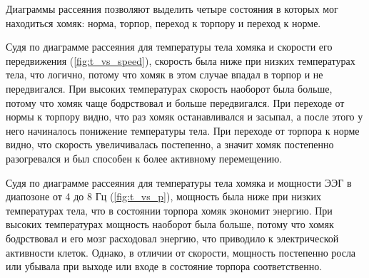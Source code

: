 \documentclass[12pt,a4paper,oneside]{article}
\begin{document}
Диаграммы рассеяния позволяют выделить четыре состояния в которых мог находиться хомяк: норма, торпор, переход к торпору и переход к норме. 

Судя по диаграмме рассеяния для температуры тела хомяка и скорости его передвижения (\ref{fig:t_vs_speed}), скорость была ниже при низких температурах тела, что логично, потому что хомяк в этом случае впадал в торпор и не передвигался. При высоких температурах скорость наоборот была больше, потому что хомяк чаще бодрствовал и больше передвигался. При переходе от нормы к торпору видно, что раз хомяк останавливался и засыпал, а после этого у него начиналось понижение температуры тела. При переходе от торпора к норме видно, что скорость увеличивалась постепенно, а значит хомяк постепенно разогревался и был способен к более активному перемещению. 

Судя по диаграмме рассеяния для температуры тела хомяка и мощности ЭЭГ в диапозоне от 4 до 8 Гц (\ref{fig:t_vs_p}), мощность была ниже при низких температурах тела, что в состоянии торпора хомяк экономит энергию. При высоких температурах мощность наоборот была больше, потому что хомяк бодрствовал и его мозг расходовал энергию, что приводило к электрической активности клеток. Однако, в отличии от скорости, мощность постепенно росла или убывала при выходе или входе в состояние торпора соответственно. 
\end{document}
